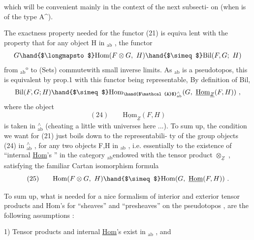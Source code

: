 
which will be  convenient mainly in the context of the next subsecti-%
on (when  is of the type A\^{}).

The exactness property needed for the functor (21) is equiva lent
with the property that for any object H in $_{\mathrm{ab}}$ , the functor
\[ G \hand{$\longmapsto$} \mathrm{Hom}(F\otimes G,\ H) \hand{$\simeq$} \mathrm{Bil}(F,G;\ H) \]
from $_{\mathrm{ab}}{}^{\mathrm{o}}$ to (Sets) commutewith small inverse limits. As $_{\mathrm{ab}}$ is a
pseudotopos, this is equivalent  by prop.1 with this functor being
representable, By definition of Bil,  
 \[ \mathrm{Bil}(F,G;H)\hand{$\simeq$} \mathrm{Hom}_{\hand{$\mathcal{A}$}^{\wedge}_{\mathrm{ab}}}(G,\ \underline{\mathrm{Hom}}_{\underline{Z}}(F,H)) \ , \]
where the object
\[ (24) \qquad \underline{\mathrm{Hom}}_{\underline{Z}}(F,H) \]
is taken in  $^{\wedge}_{\mathrm{ab}}$ (cheating a little with universes here ...). To sum
up, the condition we want for (21) just boils down to the representabili-%
ty of the  group objects (24) in $^{\wedge}_{\mathrm{ab}}$ , for any two objects F,H in $_{\mathrm{ab}}$ ,
i.e. essentially to the existence of ``internal \uline{Hom}'s '' in the category
$_{\mathrm{ab}}$\hand{(}endowed with the tensor product $\otimes_{\underline{Z}}$ \hand{)}, satisfying the familiar
Cartan isomorphism formula
\[ (25) \qquad \mathrm{Hom}(F\otimes G,\ H)\hand{$\simeq$} \mathrm{Hom}(G,\ \underline{\mathrm{Hom}}(F,H)) \ . \]

To sum up, what is needed for a nice formalism of interior and
exterior tensor products and Hom's for  ``sheaves'' and ``presheaves''
on the pseudotopos  , are the following assumptions\deleted{:}  :

1) Tensor products and  internal \uline{Hom}'s exist in $_{\mathrm{ab}}$ , and

